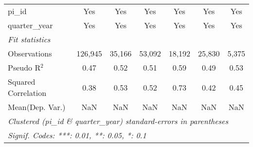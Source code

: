 \begin{tabular}{lcccccc}
   pi\_id                                                     & Yes           & Yes           & Yes           & Yes           & Yes           & Yes\\  
   quarter\_year                                              & Yes           & Yes           & Yes           & Yes           & Yes           & Yes\\  
   \midrule
   \emph{Fit statistics}\\
   Observations                                               & 126,945       & 35,166        & 53,092        & 18,192        & 25,830        & 5,375\\  
   Pseudo R$^2$                                               & 0.47          & 0.52          & 0.51          & 0.59          & 0.49          & 0.53\\  
   Squared Correlation                                        & 0.38          & 0.53          & 0.52          & 0.73          & 0.42          & 0.45\\  
Mean(Dep. Var.) & NaN & NaN & NaN & NaN & NaN & NaN \\
   \midrule \midrule
   \multicolumn{7}{l}{\emph{Clustered (pi\_id \& quarter\_year) standard-errors in parentheses}}\\
   \multicolumn{7}{l}{\emph{Signif. Codes: ***: 0.01, **: 0.05, *: 0.1}}\\
\end{tabular}
\par\endgroup
